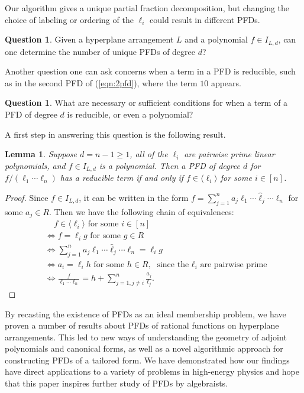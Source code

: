 \documentclass [a4paper,reqno, 11pt]{amsart}
\theoremstyle{plain}
\theoremstyle{plain}
\theoremstyle{plain}
\theoremstyle{plain}
\newtheorem{lemma}[theorem]{Lemma}
\theoremstyle{definition}
\theoremstyle{definition}
\theoremstyle{definition}
\theoremstyle{definition}
\theoremstyle{definition}
\theoremstyle{definition}
\newtheorem{question}[theorem]{Question}
\begin{document}
Our algorithm gives a unique partial fraction decomposition, but changing the choice of labeling or ordering of the $\ell_i$ could result in different PFDs.

\begin{question}
    Given a hyperplane arrangement $L$ and a polynomial $f\in I_{L,d}$, can one determine the number of unique PFDs of degree $d$?
\end{question}




Another question one can ask concerns when a term in a PFD is reducible, such as in the second PFD of (\ref{eqn:2pfd}), where the term $10$ appears.

\begin{question}
    What are necessary or sufficient conditions for when a term of a PFD of degree $d$ is reducible, or even a polynomial?
\end{question}

A first step in answering this question is the following result.

\begin{lemma}\label{lemma: reducibility}
Suppose $d=n-1\geq 1$, all of the $\ell_i$ are pairwise prime linear polynomials, and $f\in I_{L,d}$ is a polynomial. Then a PFD of degree $d$ for $f/(\ell_1\cdots\ell_n)$ has a reducible term if and only if $f\in\langle \ell_i\rangle$ for some $i\in[n]$.
\end{lemma}
\begin{proof}
Since $f\in I_{L,d}$, it can be written in the form $f=\sum_{j=1}^na_j\ell_{1}\cdots\hat{\ell}_j\cdots\ell_{n}$ for some $a_{j}\in R$. Then we have the following chain of equivalences:
\begin{align}
& \ \ \ \ \ f\in\langle\ell_i\rangle\text{ for some } i\in[n]\nonumber\\
&\Leftrightarrow f=\ell_ig\text{ for some } g\in R\nonumber\\
&\Leftrightarrow \sum_{j=1}^na_j\ell_{1}\cdots\hat{\ell}_j\cdots\ell_{n}=\ell_ig\nonumber\\
& \Leftrightarrow a_i=\ell_ih\text{ for some } h\in R,\text{ since the $\ell_i$ are pairwise prime}
\nonumber\\
&\Leftrightarrow \frac{f}{\ell_1\cdots\ell_n}=h+\sum_{j=1,j\neq i}^n \frac{a_{j}}{\ell_j}\nonumber.
\end{align}
\end{proof}


By recasting the existence of PFDs as an ideal membership problem, we have proven a number of results about PFDs of rational functions on hyperplane arrangements. This led to new ways of understanding the geometry of adjoint polynomials and canonical forms, as well as a novel algorithmic approach for constructing PFDs of a tailored form. We have demonstrated how our findings have direct applications to a variety of problems in high-energy physics and hope that this paper inspires further study of PFDs by algebraists.
\end{document}
